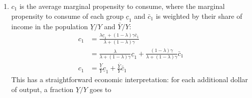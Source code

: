 \documentclass[]{book}
\theoremstyle{definition}
\theoremstyle{definition}
\theoremstyle{definition}
\theoremstyle{remark}
\begin{document}
\begin{enumerate}
\[\begin{aligned}
  \left[(1-\lambda)  N \bar{c}_{0}-(1-\lambda) N  \bar{c}_{1} \bar{t}_0\right] + 
  \frac{(1-\lambda) \gamma\bar{c}_{1}}{\lambda+(1-\lambda)\gamma}(1-t_1)Y\\
  &=\left(\lambda N  \underline{c}_{0}+(1-\lambda) N  \bar{c}_{0}\right)-\left(\lambda  N \underline{c}_{1} \underline{t}_0 +(1-\lambda) N  \bar{c}_{1} \bar{t}_0\right) +\frac{\lambda\underline{c}_{1}+\left(1-\lambda\right)\gamma\bar{c}_{1}}{\lambda+(1-\lambda)\gamma}(1-t_1)Y\\
  &=\left[\lambda N  \underline{c}_{0}+(1-\lambda) N  \bar{c}_{0}\right]-\left[\underline{c}_{1} (\lambda  N \underline{t}_0) + \bar{c}_{1} ((1-\lambda) N \bar{t}_0)\right] +\frac{\lambda\underline{c}_{1}+\left(1-\lambda\right)\gamma\bar{c}_{1}}{\lambda+(1-\lambda)\gamma}(1-t_1)Y\\
  C&=C_0 -\left(\underline{c}_{1}\underline{T}_0+\bar{c}_{1}\bar{T}_0\right)+c_1 (1-t_1) Y.
  \end{aligned}
  \] where we have used the suggested notations: \[
  \begin{aligned}
  C_{0}& \equiv \lambda  N \underline{c}_0 + (1-\lambda) N \bar{c}_0\\
  \underline{T}_{0}& \equiv \lambda  N \underline{t}_0\\
  \bar{T}_0 & \equiv (1-\lambda) N \bar{t}_0\\
  c_{1}&\equiv\frac{\lambda\underline{c}_{1}+\left(1-\lambda\right)\gamma\bar{c}_{1}}{\lambda+(1-\lambda)\gamma}.
  \end{aligned}
  \] Therefore, aggregate consumption is given by:
  \[\boxed{C=C_0 -\left(\underline{c}_{1}\underline{T}_0+\bar{c}_{1}\bar{T}_0\right)+c_1 (1-t_1) Y}.\]
\item
  \(c_1\) is the average marginal propensity to consume, where the
  marginal propensity to consume of each group \(\underline{c}_1\) and
  \(\bar{c}_1\) is weighted by their share of income in the population
  \(\underline{Y}/Y\) and \(\bar{Y}/Y\): \[
  \begin{aligned}
  c_1&=\frac{\lambda\underline{c}_{1}+\left(1-\lambda\right)\gamma \bar{c}_{1}}{\lambda+(1-\lambda)\gamma}\\
  &=\frac{\lambda}{\lambda + (1-\lambda)\gamma}\underline{c}_{1} +\frac{(1-\lambda)\gamma}{\lambda+(1-\lambda)\gamma}\bar{c}_{1}\\
  c_1&=\frac{\underline{Y}}{Y}\underline{c}_{1} + \frac{\bar{Y}}{Y}\bar{c}_{1}
  \end{aligned}
  \] This has a straightforward economic interpretation: for each
  additional dollar of output, a fraction \(\underline{Y}/Y\) goes to

\end{enumerate}
\end{document}
